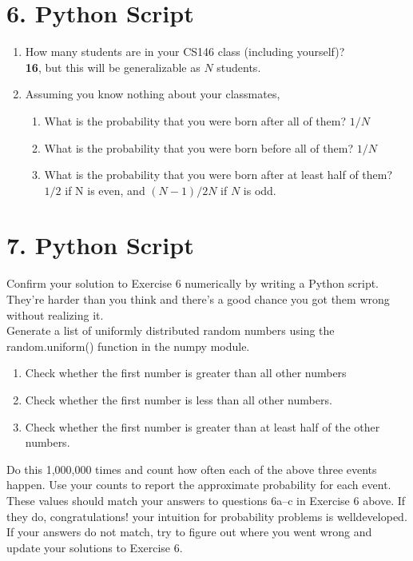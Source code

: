 \documentclass[11pt]{report}
\begin{document}
 


\newpage
\section*{6. Python Script}

\begin{enumerate}
	\item How many students are in your CS146 class (including yourself)? \\ \textbf{16}, but this will be  generalizable as \textbf{$N$} students.
	\item Assuming you know nothing about your classmates,
	\begin{enumerate}
		\item What is the probability that you were born after all of them?  $1/N$
		\item What is the probability that you were born before all of them?  $1/N$
		\item What is the probability that you were born after at least half of them?\\ $1/2$ if N is even, and $(N-1)/2N$ if $N$ is odd. 
 	\end{enumerate}

\end{enumerate}

\section*{7. Python Script}
Confirm your solution to Exercise 6 numerically by writing a Python script. They’re harder than you think and there’s a good chance you got them wrong without realizing it.\\

Generate a list of uniformly distributed random numbers using the random.uniform() function in
the numpy module.

\begin{enumerate}
		\item Check whether the first number is greater than all other numbers 
		\item Check whether the first number is less than all other numbers.
		\item Check whether the first number is greater than at least half of the other numbers.
\end{enumerate}

Do this 1,000,000 times and count how often each of the above three events happen. Use your
counts to report the approximate probability for each event. These values should match your
answers to questions 6a–c in Exercise 6 above. If they do, congratulations! your intuition for
probability problems is well­developed. If your answers do not match, try to figure out where you went wrong and update your solutions to Exercise 6.
\end{document}

